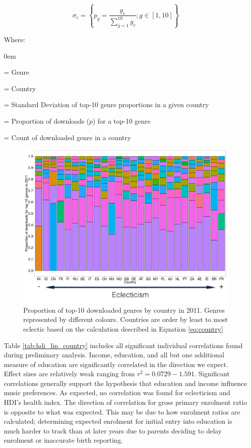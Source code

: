 \documentclass[a4paper]{article}
\begin{document}
\begin{equation}
\sigma_c = \left\{ p_g = \dfrac{g_c}{\sum\limits_{g=1}^{10} g_c}; g \in [1,10]  \right\}
\label{eq:country}
\end{equation}

Where:
\begin{description}\itemsep0em 
\vspace{2em}
\item[$g$] = Genre
\item[$u$] = Country
\item[$\bar{\sigma_c}$] = Standard Deviation of top-10 genre proportions in a given country
\item[$p_g$] = Proportion of downloads ($p$) for a top-10 genre
\item[$g_c$] = Count of downloaded genre in a country
\end{description}

\begin{figure}[h!]
\centering
\includegraphics[width=\linewidth]{hdi_eclectic}
\caption[Eclecticism and HDI by country]{Proportion of top-10 downloaded genres by country in 2011. Genres represented by different colours. Countries are order by least to most eclectic based on the calculation described in Equation \ref{eq:country}}
\label{fig:ecclec}
\end{figure}

Table \ref{tab:hdi_lin_country} includes all significant individual correlations found during preliminary analysis. Income, education, and all but one additional measure of education are significantly correlated in the direction we expect. Effect sizes are relatively weak ranging from $r^2 = 0.0729-1.591$. Significant correlations generally support the hypothesis that education and income influence music preferences. As expected, no correlation was found for eclecticism and \Gls{HDI}'s health index. The direction of correlation for gross primary enrolment ratio is opposite to what was expected. This may be due to how enrolment ratios are calculated; determining expected enrolment for initial entry into education is much harder to track than at later years due to parents deciding to delay enrolment or inaccurate birth reporting.
\end{document}
